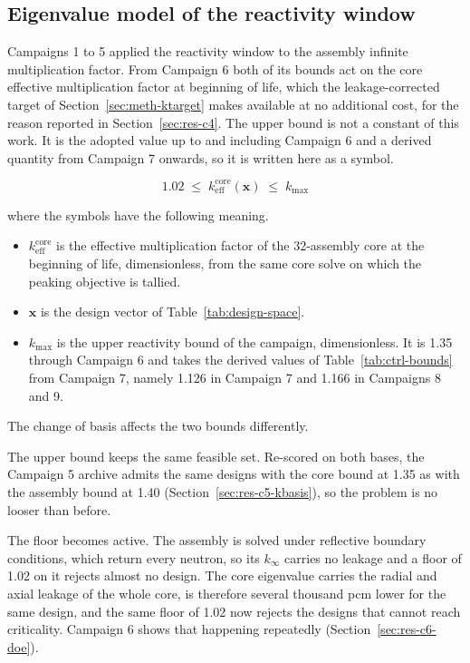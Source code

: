 \subsection{Eigenvalue model of the reactivity window}
\label{sec:meth-kbasis}

Campaigns 1 to 5 applied the reactivity window to the assembly infinite
multiplication factor. From Campaign 6 both of its bounds act on the
core effective multiplication factor at beginning of life, which the
leakage-corrected target of Section~\ref{sec:meth-ktarget} makes
available at no additional cost, for the reason reported in
Section~\ref{sec:res-c4}. The upper bound is not a constant of this work. It
is the adopted value up to and including Campaign 6 and a
derived quantity from Campaign 7 onwards, so it is written here as a symbol.

\begin{equation}
1.02 \;\le\; k_\mathrm{eff}^\mathrm{core}(\mathbf{x}) \;\le\; k_{\max}
\label{eq:k-window-core}
\end{equation}

\noindent where the symbols have the following meaning.

\begin{itemize}
  \item $k_\mathrm{eff}^\mathrm{core}$ is the effective multiplication
        factor of the 32-assembly core at the beginning of life,
        dimensionless, from the same core solve on which the peaking
        objective is tallied.

  \item $\mathbf{x}$ is the design vector of
        Table~\ref{tab:design-space}.

  \item $k_{\max}$ is the upper reactivity bound of the campaign,
        dimensionless. It is 1.35 through Campaign 6 and takes the
        derived values of Table~\ref{tab:ctrl-bounds} from Campaign 7,
        namely 1.126 in Campaign 7 and 1.166 in Campaigns 8 and 9.
\end{itemize}

The change of basis affects the two bounds differently.

The upper bound keeps the same feasible set. Re-scored on both bases, the
Campaign 5 archive admits the same designs with the core bound at 1.35
as with the assembly bound at 1.40
(Section~\ref{sec:res-c5-kbasis}), so the problem is no looser than
before.

The floor becomes active. The assembly is solved under reflective
boundary conditions, which return every neutron, so its $k_\infty$
carries no leakage and a floor of 1.02 on it rejects almost no design.
The core eigenvalue carries the radial and axial leakage of the whole
core, is therefore several thousand pcm lower for the same design, and
the same floor of 1.02 now rejects the designs that cannot reach
criticality. Campaign 6 shows that happening repeatedly
(Section~\ref{sec:res-c6-doe}).

